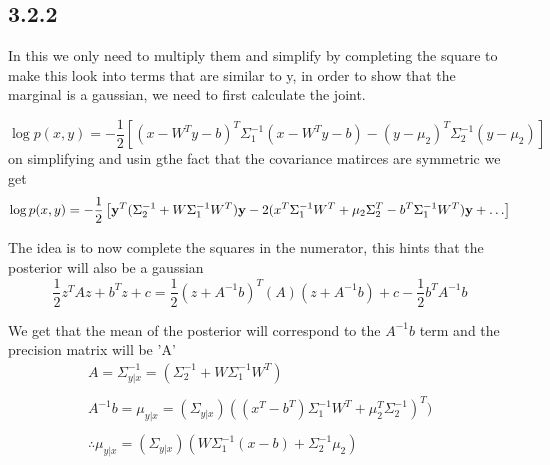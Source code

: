 \subsection{3.2.2}
In this we only need to multiply them and simplify by completing the square
to make this look into terms that are similar to y, in order to show that the marginal is a gaussian, we need to first calculate the joint.

\begin{equation}
   \log p(x, y) = -\frac{1}{2} \left [(x - W^Ty - b)^T \Sigma_1^{-1} (x - W^Ty - b) - (y - \mu_2)^T\Sigma_2^{-1}(y - \mu_2) \right]
\end{equation}
on simplifying and usin gthe fact that the covariance matirces are symmetric we get
\begin{equation}
   \log p(x, y) = -\frac{1}{2} \left [\vb{y}^T(\Sigma_2^{-1} + W \Sigma_1^{-1} W^T)\vb{y} -2(x^T\Sigma_1^{-1} W^T + \mu_2 \Sigma_2^T  - b^T\Sigma_1^{-1}W^T)\vb{y} + \ldots \right]
\end{equation}

The idea is to now complete the squares in the numerator, this hints that the posterior will also be a gaussian
\begin{equation}
    \frac{1}{2} z^T A z  + b^Tz + c = \frac{1}{2}(z + A^{-1}b)^T(A)(z + A^{-1}b) + c - \frac{1}{2}b^TA^{-1}b
\end{equation}

We get that the mean of the posterior will correspond to the $A^{-1}b $ term and the precision matrix  will be 'A'
\begin{gather*}
    \boxed{A    = \Sigma_{y|x}^{-1} = (\Sigma_2^{-1} + W \Sigma_1^{-1} W^T)}
    \\
    \\
    {A^{-1}b = \mu_{y|x} = (\Sigma_{y|x})((x^T - b^T)\Sigma_1^{-1} W^T + \mu_2^T \Sigma_2^{-1})^T)}
    \\
    \\
    \therefore \boxed{\mu_{y|x} = (\Sigma_{y|x})(W\Sigma_1^{-1}(x - b) + \Sigma_2^{-1} \mu_2)}
\end{gather*}


